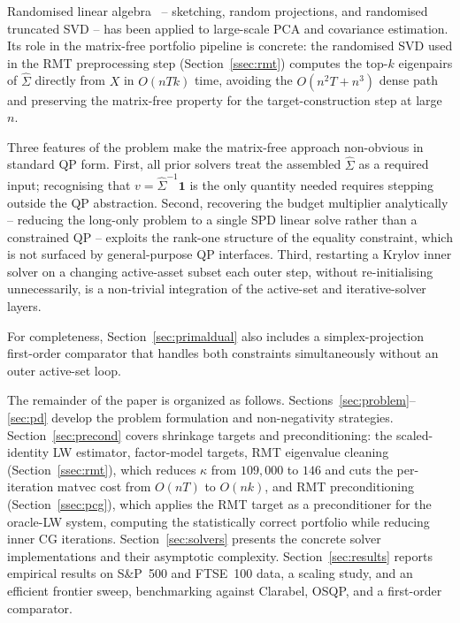 Randomised linear algebra~\cite{halko2011} -- sketching, random projections, and
randomised truncated SVD -- has been applied to large-scale PCA and covariance
estimation. Its role in the matrix-free portfolio pipeline is concrete: the
randomised SVD used in the RMT preprocessing step (Section~\ref{ssec:rmt})
computes the top-$k$ eigenpairs of $\hat\Sigma$ directly from $X$ in $O(nTk)$
time, avoiding the $O(n^2T + n^3)$ dense path and preserving the matrix-free
property for the target-construction step at large $n$.

Three features of the problem make the matrix-free approach non-obvious in standard
QP form. First, all prior solvers treat the assembled $\hat\Sigma$ as a required input;
recognising that $v = \hat\Sigma^{-1}\mathbf{1}$ is the only quantity needed requires
stepping outside the QP abstraction. Second, recovering the budget multiplier
analytically -- reducing the long-only problem to a single SPD linear solve rather than
a constrained QP -- exploits the rank-one structure of the equality constraint, which is
not surfaced by general-purpose QP interfaces. Third, restarting a Krylov inner solver
on a changing active-asset subset each outer step, without re-initialising unnecessarily,
is a non-trivial integration of the active-set and iterative-solver layers.

For completeness, Section~\ref{sec:primaldual} also includes a simplex-projection
first-order comparator that handles both constraints simultaneously without an outer active-set loop.

The remainder of the paper is organized as follows.
Sections~\ref{sec:problem}--\ref{sec:pd} develop the problem formulation and
non-negativity strategies. Section~\ref{sec:precond} covers shrinkage targets and preconditioning:
the scaled-identity LW estimator, factor-model targets,
RMT eigenvalue cleaning (Section~\ref{ssec:rmt}), which reduces $\kappa$ from
$109{,}000$ to $146$ and cuts the per-iteration matvec cost from $O(nT)$ to $O(nk)$,
and RMT preconditioning (Section~\ref{ssec:pcg}), which applies the RMT target as a
preconditioner for the oracle-LW system, computing the statistically correct portfolio
while reducing inner CG iterations.
Section~\ref{sec:solvers} presents the concrete solver implementations and
their asymptotic complexity. Section~\ref{sec:results} reports empirical results
on S\&P~500 and FTSE~100 data, a scaling study, and an efficient frontier sweep,
benchmarking against Clarabel, OSQP, and a first-order comparator.
